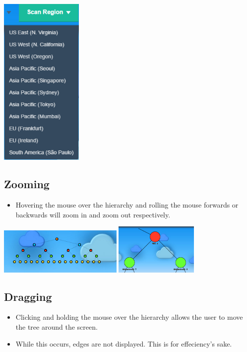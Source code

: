 \documentclass[hidelinks,a4paper,12pt]{article}
\begin{document}
	\begin{center}
		\includegraphics[width=0.3\textwidth]{./images/RegionSelect.png}
	\end{center}	
		
	\subsection{Zooming}
			\begin {itemize}
			\item Hovering the mouse over the hierarchy and rolling the mouse forwards or backwards will zoom in and zoom out respectively.
		\end{itemize}
		
		\begin{center}
			\includegraphics[width=0.45\textwidth]{./images/ZoomOut.png}
			\includegraphics[width=0.3\textwidth]{./images/ZoomIn.png}
		\end{center}	
	
	\newpage
	\subsection{Dragging}
				\begin {itemize}
				\item Clicking and holding the mouse over the hierarchy allows the user to move the tree around the screen.
				\item While this occurs, edges are not displayed. This is for effeciency's sake.
			\end{itemize}
			
\end{document}

